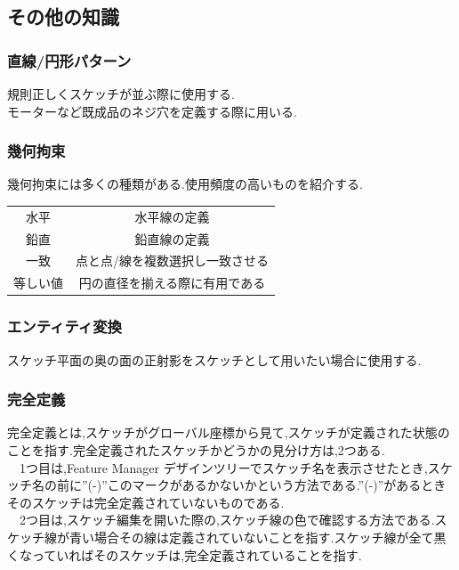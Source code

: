 \documentclass[a4paper,11pt]{jsarticle}
\begin{document}
\subsection{その他の知識}
\subsubsection{直線/円形パターン}
規則正しくスケッチが並ぶ際に使用する.\\
モーターなど既成品のネジ穴を定義する際に用いる.
\subsubsection{幾何拘束}
幾何拘束には多くの種類がある.使用頻度の高いものを紹介する.\\
\begin{table}[h]
\centering
\begin{tabular}[t]{|c|c|}
 水平& 水平線の定義\\
 鉛直& 鉛直線の定義\\
 一致& 点と点/線を複数選択し一致させる\\
 等しい値& 円の直径を揃える際に有用である\\
\end{tabular}
\end{table}
\subsubsection{エンティティ変換}
スケッチ平面の奥の面の正射影をスケッチとして用いたい場合に使用する.
\subsubsection{完全定義}
完全定義とは,スケッチがグローバル座標から見て,スケッチが定義された状態のことを指す.完全定義されたスケッチかどうかの見分け方は,2つある.\\
　1つ目は,Feature Manager デザインツリーでスケッチ名を表示させたとき,スケッチ名の前に''(-)''このマークがあるかないかという方法である.''(-)''があるときそのスケッチは完全定義されていないものである.\\
　2つ目は,スケッチ編集を開いた際の,スケッチ線の色で確認する方法である.スケッチ線が青い場合その線は定義されていないことを指す.スケッチ線が全て黒くなっていればそのスケッチは,完全定義されていることを指す.
\end{document}
